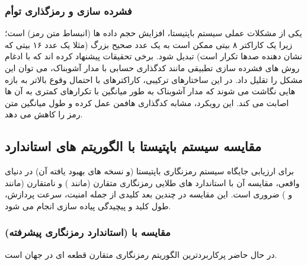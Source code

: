 \documentclass[12pt]{report}
\begin{document}
\subsubsection{فشرده سازی و رمزگذاری توأم}
یکی از مشکلات عملی سیستم باپتیستا، افزایش حجم داده ها (انبساط متن رمز) 
است؛ زیرا یک کاراکتر ۸ بیتی ممکن است به یک عدد صحیح بزرگ (مثلا یک عدد ۱۶ بیتی که نشان دهنده 
صدها تکرار است) تبدیل شود. برخی تحقیقات پیشنهاد کرده اند که با ادغام روش های فشرده سازی تطبیقی 
مانند کدگذاری حسابی با مدار آشوبناک، می توان این مشکل را 
تقلیل داد. در این ساختارهای ترکیبی، کاراکترهای با احتمال وقوع بالاتر به بازه هایی نگاشت می شوند 
که مدار آشوبناک به طور میانگین با تکرارهای کمتری به آن ها اصابت می کند. این رویکرد، مشابه 
کدگذاری هافمن عمل کرده و طول میانگین متن رمز را کاهش می دهد.

\newpage

\subsection{مقایسه سیستم باپتیستا با الگوریتم های استاندارد}
برای ارزیابی جایگاه سیستم رمزنگاری باپتیستا (و نسخه های بهبود یافته آن) در دنیای واقعی، مقایسه 
آن با استاندارد های طلایی رمزنگاری متقارن (مانند ) و نامتقارن (مانند  و ) 
ضروری است. این مقایسه در چندین بعد کلیدی از جمله امنیت، سرعت پردازش، طول کلید و پیچیدگی 
پیاده سازی انجام می شود.

\subsubsection{مقایسه با  (استاندارد رمزنگاری پیشرفته)}
 در حال حاضر پرکاربردترین الگوریتم رمزنگاری متقارن قطعه ای در جهان است.
\end{document}
